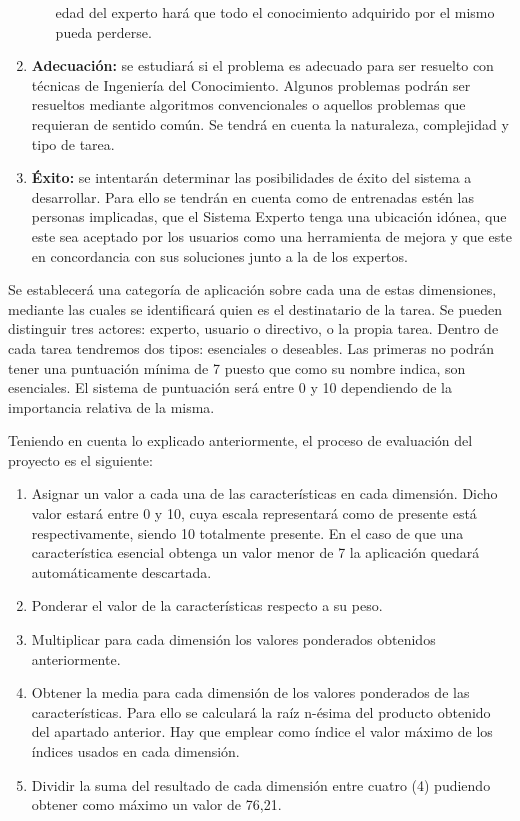 \begin{enumerate}
\begin{itemize}
        edad del experto hará que todo el conocimiento adquirido por el mismo pueda perderse.
    \end{itemize}
  \item \textbf{Adecuación: } se estudiará si el problema es adecuado para ser resuelto con técnicas
    de Ingeniería del Conocimiento. Algunos problemas podrán ser resueltos mediante algoritmos convencionales
    o aquellos problemas que requieran de sentido común. Se tendrá en cuenta la naturaleza, complejidad
    y tipo de tarea.
  \item \textbf{Éxito: } se intentarán determinar las posibilidades de éxito del sistema a desarrollar. Para
    ello se tendrán en cuenta como de entrenadas estén las personas implicadas, que el Sistema Experto tenga
    una ubicación idónea, que este sea aceptado por los usuarios como una herramienta de mejora y que este en
    concordancia con sus soluciones junto a la de los expertos.
\end{enumerate}

Se establecerá una categoría de aplicación sobre cada una de estas dimensiones,
mediante las cuales se identificará quien es el destinatario de la tarea.
Se pueden distinguir tres actores: experto, usuario o directivo, o la propia tarea.
Dentro de cada tarea tendremos dos tipos: esenciales o deseables. Las primeras no
podrán tener una puntuación mínima de 7 puesto que como su nombre indica, son esenciales.
El sistema de puntuación será entre 0 y 10 dependiendo de la importancia relativa de la misma.

Teniendo en cuenta lo explicado anteriormente, el proceso de evaluación del proyecto es el siguiente:

\begin{enumerate}
  \item Asignar un valor a cada una de las características en cada dimensión. Dicho valor estará
    entre 0 y 10, cuya escala representará como de presente está respectivamente, siendo 10 totalmente
    presente. En el caso de que una característica esencial obtenga un valor menor de 7 la aplicación
    quedará automáticamente descartada.
  \item Ponderar el valor de la características respecto a su peso.
  \item Multiplicar para cada dimensión los valores ponderados obtenidos anteriormente.
  \item Obtener la media para cada dimensión de los valores ponderados de las características.
    Para ello se calculará la raíz n-ésima del producto obtenido del apartado anterior. Hay que
    emplear como índice el valor máximo de los índices usados en cada dimensión.
  \item Dividir la suma del resultado de cada dimensión entre cuatro (4) pudiendo obtener como máximo
    un valor de 76,21.
\end{enumerate}

